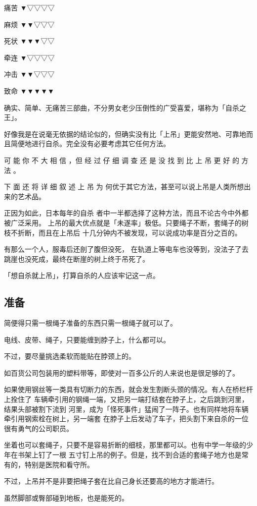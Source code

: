 \documentclass[UTF8]{ctexart}
\begin{document}
痛苦 ▼▽▽▽▽

麻烦 ▼▼▽▽▽

死状 ▼▼▼▽▽

牵连 ▼▽▽▽▽

冲击 ▼▼▽▽▽

致命 ▼▼▼▼▼

确实、简单、无痛苦三部曲，不分男女老少压倒性的广受喜爱，堪称为「自杀之王」。

好像我是在说毫无依据的结论似的，但确实没有比「上吊」更能安然地、可靠地而且简便地进行自杀。完全没有必要考虑其它任何方法。

可 能 你 不 大 相 信 ，但 经 过 仔 细 调 查 还 是 没 找 到 比 上 吊 更 好 的 方 法 。

下 面 还 将 详 细 叙 述 上 吊 为 何优于其它方法，甚至可以说上吊是人类所想出来的艺术品。

正因为如此，日本每年的自杀 者中一半都选择了这种方法，而且不论古今中外都被广泛采用。 上吊的最大优点就是「未遂率」极低。只要绳子不断，套绳子的树枝不折断，而且在上吊后 十几分钟内不被发现，可以说成功率是百分之百的。

有那么一个人，服毒后还剖了腹但没死， 在轨道上等电车也没等到，没法子了去跳崖也没死成，最终在断崖的树上终于吊死了。

「想自杀就上吊」，打算自杀的人应该牢记这一点。

\subsection{准备}

简便得只需一根绳子准备的东西只需一根绳子就可以了。

电线、皮带、绳子，只要能缠到脖子上，什么都可以。

不过，要尽量挑选柔软而能贴在脖颈上的。

如百货公司包装用的塑料带等，即使对一百多公斤的人来说也是很足够的了。

如果使用钢丝等一类具有切断力的东西，就会发生割断头颈的情况。有人在桥栏杆上拴住了
车辆牵引用的钢绳一端，又把另一端打结套在脖子上，之后跳到河里，结果头部被割下流到
河里，成为「怪死事件」猛闹了一阵子。也有同样地将车辆牵引用钢索栓在树上，另一端套
在脖子上后发动了车子，把头割下来自杀的一位很有勇气的公司职员。

坐着也可以套绳子，只要不是容易折断的细枝，那里都可以。也有中学一年级的少年在书架上钉了一根
五寸钉上吊的例子。但是，找不到合适的套绳子地方也是常有的，特别是医院和看守所。

不过，上吊并不是非要把绳子套在比自己身长还要高的地方才能进行。

虽然脚部或臀部碰到地板，也是能死的。
\end{document}
